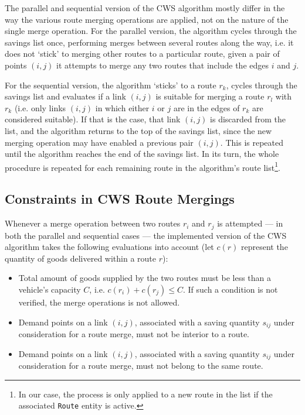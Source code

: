 The parallel and sequential version of the CWS algorithm mostly differ in the 
way the various route merging operations are applied, not on the nature of 
the single merge operation. For the parallel version, the algorithm cycles 
through the savings list once, performing merges between several routes 
along the way, i.e. it does not `stick' to merging other routes to a particular 
route, given a pair of points $(i,j)$ it attempts to merge any two routes that 
include the edges $i$ and $j$.\vertbreak

For the sequential version, the algorithm `sticks' to a route $r_k$, cycles 
through the savings list and evaluates if a link $(i,j)$ is suitable for 
merging a route $r_l$ with $r_k$ (i.e. only links $(i,j)$ in which either $i$ 
or $j$ are in the edges of $r_k$ are considered suitable). If that is the case, 
that link $(i,j)$ is discarded from the list, and the algorithm returns to the 
top of the savings list, since the new merging operation may have enabled a 
previous pair $(i,j)$. This is repeated until the algorithm reaches the end of 
the savings list. In its turn, the whole procedure is repeated for each 
remaining route in the algorithm's route list\cprotect\footnote{In our case, 
the process 
is only applied to a new route in the list if the associated \verb?Route? 
entity is active.}.

\subsection{Constraints in CWS Route Mergings}
\label{subsec:const}

Whenever a merge operation between two routes $r_i$ and $r_j$ is attempted --- in 
both the parallel and sequential cases --- the implemented version of the CWS 
algorithm takes the following evaluations into account (let $c(r)$ represent 
the quantity of goods delivered within a route $r$):

\begin{itemize}

    \item Total amount of goods supplied by the two routes must be less than 
            a vehicle's capacity $C$, i.e. $c(r_i) + c(r_j) \le C$. If 
            such a condition is not verified, the merge operations is not allowed.
    \item Demand points on a link $(i,j)$, associated with a saving quantity $s_{ij}$ 
            under consideration for a route merge, must not be interior to 
            a route.
    \item Demand points on a link $(i,j)$, associated with a saving quantity $s_{ij}$ 
            under consideration for a route merge, must not belong to the same 
            route.

\end{itemize}

